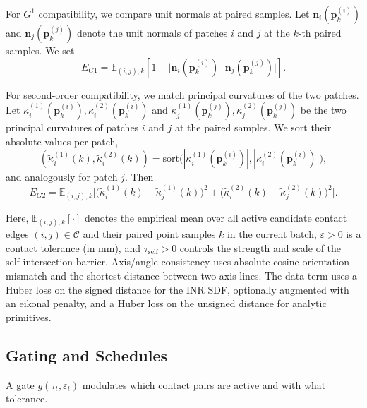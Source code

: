 \documentclass{ieeeaccess}
\begin{document}
For $G^1$ compatibility, we compare unit normals at paired samples. Let
$\mathbf{n}_i(\mathbf{p}^{(i)}_k)$ and $\mathbf{n}_j(\mathbf{p}^{(j)}_k)$
denote the unit normals of patches $i$ and $j$ at the $k$-th paired samples.
We set
\begin{equation}
E_{G1}
= \mathbb{E}_{(i,j),k}\!\left[
1 - \bigl|\mathbf{n}_i(\mathbf{p}^{(i)}_k) \cdot
          \mathbf{n}_j(\mathbf{p}^{(j)}_k)\bigr|
\right].
\end{equation}

For second-order compatibility, we match principal curvatures of the two
patches. Let
$\kappa_i^{(1)}(\mathbf{p}^{(i)}_k),\kappa_i^{(2)}(\mathbf{p}^{(i)}_k)$
and
$\kappa_j^{(1)}(\mathbf{p}^{(j)}_k),\kappa_j^{(2)}(\mathbf{p}^{(j)}_k)$
be the two principal curvatures of patches $i$ and $j$ at the paired
samples. We sort their absolute values per patch,
\[
(\tilde{\kappa}_i^{(1)}(k), \tilde{\kappa}_i^{(2)}(k))
= \mathrm{sort}\bigl(|\kappa_i^{(1)}(\mathbf{p}^{(i)}_k)|,
                     |\kappa_i^{(2)}(\mathbf{p}^{(i)}_k)|\bigr),
\]
and analogously for patch $j$. Then
\begin{equation}
E_{G2}
= \mathbb{E}_{(i,j),k}\!\Big[
 \bigl(\tilde{\kappa}_i^{(1)}(k)-\tilde{\kappa}_j^{(1)}(k)\bigr)^2
+\bigl(\tilde{\kappa}_i^{(2)}(k)-\tilde{\kappa}_j^{(2)}(k)\bigr)^2
\Big].
\end{equation}

Here, $\mathbb{E}_{(i,j),k}[\cdot]$ denotes the empirical mean over all
active candidate contact edges $(i,j)\in\mathcal{C}$ and their paired
point samples $k$ in the current batch, $\varepsilon>0$ is a contact
tolerance (in mm), and $\tau_{\mathrm{self}}>0$ controls the strength
and scale of the self-intersection barrier. Axis/angle consistency uses
absolute-cosine orientation mismatch and the shortest distance between
two axis lines. The data term uses a Huber loss on the signed distance
for the INR SDF, optionally augmented with an eikonal penalty, and a
Huber loss on the unsigned distance for analytic primitives.



\subsection{Gating and Schedules}
A gate $g(\tau_t,\varepsilon_t)$ modulates which contact pairs are active and with what tolerance.
\end{document}
